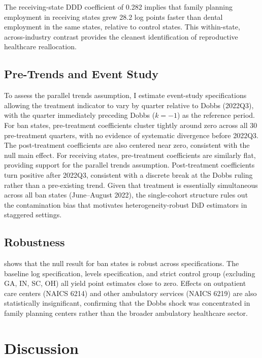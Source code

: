 \documentclass[12pt]{article}
\begin{document}
The receiving-state DDD coefficient of 0.282 implies that family planning employment in receiving states grew 28.2 log points faster than dental employment in the same states, relative to control states. This within-state, across-industry contrast provides the cleanest identification of reproductive healthcare reallocation.

\subsection{Pre-Trends and Event Study}

To assess the parallel trends assumption, I estimate event-study specifications allowing the treatment indicator to vary by quarter relative to Dobbs (2022Q3), with the quarter immediately preceding Dobbs ($k = -1$) as the reference period. For ban states, pre-treatment coefficients cluster tightly around zero across all 30 pre-treatment quarters, with no evidence of systematic divergence before 2022Q3. The post-treatment coefficients are also centered near zero, consistent with the null main effect. For receiving states, pre-treatment coefficients are similarly flat, providing support for the parallel trends assumption. Post-treatment coefficients turn positive after 2022Q3, consistent with a discrete break at the Dobbs ruling rather than a pre-existing trend. Given that treatment is essentially simultaneous across all ban states (June--August 2022), the single-cohort structure rules out the contamination bias that motivates heterogeneity-robust DiD estimators in staggered settings.

\subsection{Robustness}



 shows that the null result for ban states is robust across specifications. The baseline log specification, levels specification, and strict control group (excluding GA, IN, SC, OH) all yield point estimates close to zero. Effects on outpatient care centers (NAICS 6214) and other ambulatory services (NAICS 6219) are also statistically insignificant, confirming that the Dobbs shock was concentrated in family planning centers rather than the broader ambulatory healthcare sector.


\section{Discussion}
\label{sec:discussion}
\end{document}
